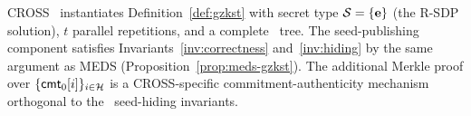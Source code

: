\begin{proposition}
\label{prop:cross-gzkst}
CROSS~\cite{CROSSspec} instantiates Definition~\ref{def:gzkst} with secret type
$\mathcal{S} = \{\mathbf{e}\}$ (the R-SDP solution),
$t$ parallel repetitions, and a complete \GGM\ tree.
The seed-publishing component satisfies
Invariants~\ref{inv:correctness} and~\ref{inv:hiding} by the same argument
as MEDS (Proposition~\ref{prop:meds-gzkst}).
The additional Merkle proof over $\{\mathsf{cmt}_0[i]\}_{i \in \mathcal{H}}$ is
a CROSS-specific commitment-authenticity mechanism orthogonal to the
\GZKST\ seed-hiding invariants.
\end{proposition}


 

